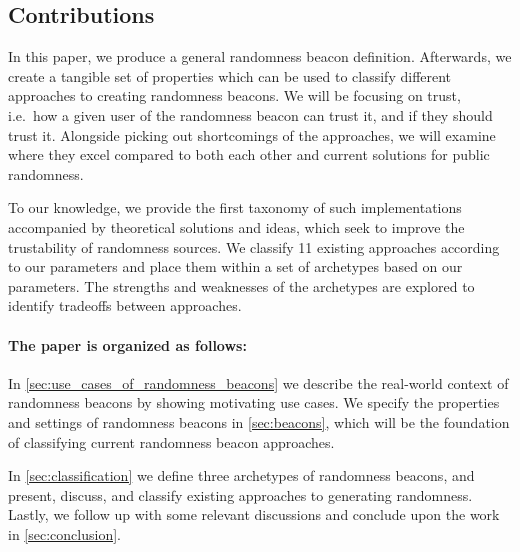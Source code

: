 \subsection*{Contributions}\label{subsec:contributions}
In this paper, we produce a general randomness beacon definition. Afterwards, we create a tangible set of properties which can be used to classify different approaches to creating randomness beacons.
We will be focusing on trust, i.e.\ how a given user of the randomness beacon can trust it, and if they should trust it.
Alongside picking out shortcomings of the approaches, we will examine where they excel compared to both each other and current solutions for public randomness.

To our knowledge, we provide the first taxonomy of such implementations accompanied by theoretical solutions and ideas, which seek to improve the trustability of randomness sources.
We classify 11 existing approaches according to our parameters and place them within a set of archetypes based on our parameters. The strengths and weaknesses of the archetypes are explored to identify tradeoffs between approaches.


\paragraph{The paper is organized as follows:}
In \cref{sec:use_cases_of_randomness_beacons} we describe the real-world context of randomness beacons by showing motivating use cases.
We specify the properties and settings of randomness beacons in \cref{sec:beacons}, which will be the foundation of classifying current randomness beacon approaches.

In \cref{sec:classification} we define three archetypes of randomness beacons, and present, discuss, and classify existing approaches to generating randomness.
Lastly, we follow up with some relevant discussions and  conclude upon the work in \cref{sec:conclusion}.
